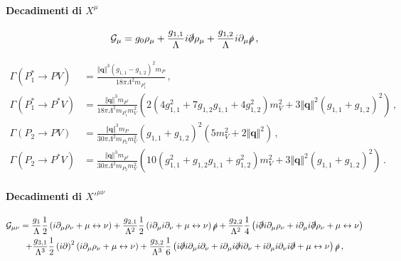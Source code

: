 \documentclass{article}
\begin{document}
\paragraph{Decadimenti di $X^\mu$}
\begin{equation}
  \mathcal{G}_\mu = g_0 \rho_\mu + \frac{g_{1,1}}{\Lambda} i \slashed{\partial} \rho_\mu + \frac{g_{1,2}}{\Lambda} i \partial_\mu \slashed{\rho} \, ,
\end{equation}

\begin{align}
  \Gamma\left( P^*_1 \to P V \right) &= \frac{\Vert \mathbf{q} \Vert^3 \left(g_{1,1}-g_{1,2}\right)^2 m_P}{18 \pi  \Lambda ^2 m_{P_1^*}} \, , \\
  \Gamma\left( P^*_1 \to P^* V \right) &= \frac{\Vert \mathbf{q} \Vert^3 m_{P^*}}{18 \pi  \Lambda^2 m_{P_1^*} m_V^2} \left(2 \left(4 g_{1,1}^2+7 g_{1,2} g_{1,1}+4 g_{1,2}^2\right) m_V^2+3 \Vert \mathbf{q} \Vert^2 \left(g_{1,1}+g_{1,2}\right)^2\right) \, , \\
  \Gamma\left( P_2 \to P V \right) &= \frac{\Vert\mathbf{q}\Vert^3 m_P}{30 \pi \Lambda ^2 m_{P_2} m_V^2} \left(g_{1,1}+g_{1,2}\right)^2 \left(5 m_V^2+2 \Vert\mathbf{q}\Vert^2\right)  \, , \\
  \Gamma\left( P_2 \to P^* V \right) &= \frac{\Vert\mathbf{q}\Vert^3 m_{P^*} }{30 \pi \Lambda^2 m_{P_2} m_V^2} \left(10 \left(g_{1,1}^2+g_{1,2} g_{1,1}+g_{1,2}^2\right) m_V^2+3 \Vert\mathbf{q}\Vert^2 \left(g_{1,1}+g_{1,2}\right)^2\right) \, . 
\end{align}

\paragraph{Decadimenti di $X'^{\mu \nu}$}
\begin{multline}
  \mathcal{G}_{\mu \nu} = \frac{g_1}{\Lambda} \frac{1}{2} \left( i \partial_\mu \rho_\nu + \mu \leftrightarrow \nu \right) + \frac{g_{2,1}}{\Lambda^2} \frac{1}{2} \left( i \partial_\mu i \partial_\nu + \mu \leftrightarrow \nu \right) \slashed{\rho} + \frac{g_{2,2}}{\Lambda^2} \frac{1}{4} \left( i \slashed{\partial} i \partial_\mu \rho_\nu + i \partial_\mu i \slashed{\partial} \rho_\nu + \mu \leftrightarrow \nu \right) \\ + \frac{g_{3,1}}{\Lambda^3} \frac{1}{2} \left(i \partial \right)^2 \left( i \partial_\mu \rho_\nu + \mu \leftrightarrow \nu \right) + \frac{g_{3,2}}{\Lambda^3} \frac{1}{6} \left( i \slashed{\partial} i \partial_\mu i \partial_\nu + i \partial_\mu i \slashed{\partial} i \partial_\nu + i \partial_\mu i \partial_\nu i \slashed{\partial}  + \mu \leftrightarrow \nu \right) \slashed{\rho} \, ,
\end{multline}
\end{document}
